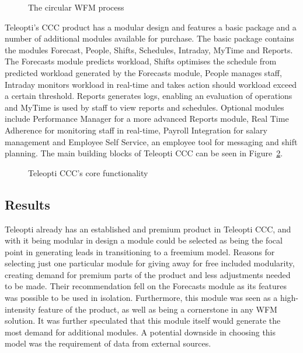 \begin{figure}[H]
    \centering
    \caption{The circular WFM process}
    \label{fig:wfm}
\end{figure}

Teleopti's CCC product has a modular design and features a basic package and a number of additional modules available for purchase. The basic package contains the modules Forecast, People, Shifts, Schedules, Intraday, MyTime and Reports. The Forecasts module predicts workload, Shifts optimises the schedule from predicted workload generated by the Forecasts module, People manages staff, Intraday monitors workload in real-time and takes action should workload exceed a certain threshold. Reports generates logs, enabling an evaluation of operations and MyTime is used by staff to view reports and schedules. Optional modules include Performance Manager for a more advanced Reports module, Real Time Adherence for monitoring staff in real-time, Payroll Integration for salary management and Employee Self Service, an employee tool for messaging and shift planning. The main building blocks of Teleopti CCC can be seen in Figure~\ref{fig:teleopticcc}.

\begin{figure}[H]
    \centering
    \caption{Teleopti CCC's core functionality~\cite{teleopti2016}}
    \label{fig:teleopticcc}
\end{figure}

\subsection{Results}
Teleopti already has an established and premium product in Teleopti CCC, and with it being modular in design a module could be selected as being the focal point in generating leads in transitioning to a freemium model. Reasons for selecting just one particular module for giving away for free included modularity, creating demand for premium parts of the product and less adjustments needed to be made. Their recommendation fell on the Forecasts module as its features was possible to be used in isolation. Furthermore, this module was seen as a high-intensity feature of the product, as well as being a cornerstone in any WFM solution. It was further speculated that this module itself would generate the most demand for additional modules. A potential downside in choosing this model was the requirement of data from external sources.


